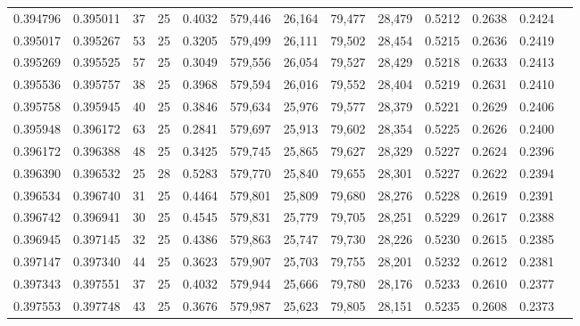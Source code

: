 \begin{tabular}{rrrrrrrrrrrrr}
0.394796 & 0.395011 &    37 &  25 &                                     0.4032 & 579,446 &  26,164 &  79,477 &  28,479 & 0.5212 & 0.2638 & 0.2424 \\
0.395017 & 0.395267 &    53 &  25 &                                     0.3205 & 579,499 &  26,111 &  79,502 &  28,454 & 0.5215 & 0.2636 & 0.2419 \\
0.395269 & 0.395525 &    57 &  25 &                                     0.3049 & 579,556 &  26,054 &  79,527 &  28,429 & 0.5218 & 0.2633 & 0.2413 \\
0.395536 & 0.395757 &    38 &  25 &                                     0.3968 & 579,594 &  26,016 &  79,552 &  28,404 & 0.5219 & 0.2631 & 0.2410 \\
0.395758 & 0.395945 &    40 &  25 &                                     0.3846 & 579,634 &  25,976 &  79,577 &  28,379 & 0.5221 & 0.2629 & 0.2406 \\
0.395948 & 0.396172 &    63 &  25 &                                     0.2841 & 579,697 &  25,913 &  79,602 &  28,354 & 0.5225 & 0.2626 & 0.2400 \\
0.396172 & 0.396388 &    48 &  25 &                                     0.3425 & 579,745 &  25,865 &  79,627 &  28,329 & 0.5227 & 0.2624 & 0.2396 \\
0.396390 & 0.396532 &    25 &  28 &                                     0.5283 & 579,770 &  25,840 &  79,655 &  28,301 & 0.5227 & 0.2622 & 0.2394 \\
0.396534 & 0.396740 &    31 &  25 &                                     0.4464 & 579,801 &  25,809 &  79,680 &  28,276 & 0.5228 & 0.2619 & 0.2391 \\
0.396742 & 0.396941 &    30 &  25 &                                     0.4545 & 579,831 &  25,779 &  79,705 &  28,251 & 0.5229 & 0.2617 & 0.2388 \\
0.396945 & 0.397145 &    32 &  25 &                                     0.4386 & 579,863 &  25,747 &  79,730 &  28,226 & 0.5230 & 0.2615 & 0.2385 \\
0.397147 & 0.397340 &    44 &  25 &                                     0.3623 & 579,907 &  25,703 &  79,755 &  28,201 & 0.5232 & 0.2612 & 0.2381 \\
0.397343 & 0.397551 &    37 &  25 &                                     0.4032 & 579,944 &  25,666 &  79,780 &  28,176 & 0.5233 & 0.2610 & 0.2377 \\
0.397553 & 0.397748 &    43 &  25 &                                     0.3676 & 579,987 &  25,623 &  79,805 &  28,151 & 0.5235 & 0.2608 & 0.2373 \\

\end{tabular}
